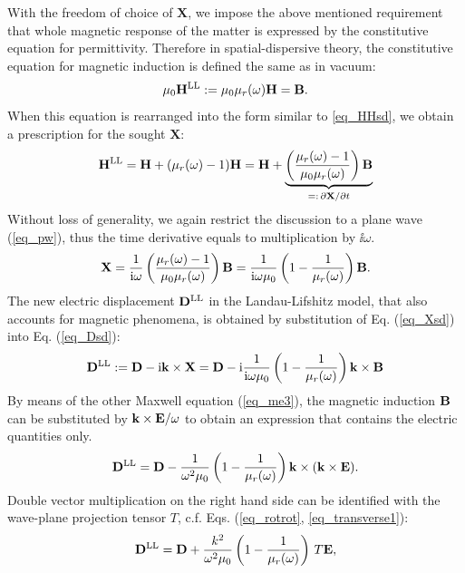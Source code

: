 With the freedom of choice of $\mathbf{X}$, we impose the above mentioned requirement that whole magnetic response of the matter is expressed by the constitutive equation for permittivity. Therefore in spatial-dispersive theory, the constitutive equation %
for magnetic induction is defined the same as in vacuum:
\begin{equation} \mu_0 {\mathbf{H}^\text{LL}} := \mu_0 \mu_r(\omega) \mathbf{H} = \mathbf{B}. \label{eq_mu_sd}\end{equation}
When this equation is rearranged into the form similar to \ref{eq_HHsd}, we obtain a prescription for the sought $\mathbf{X}$: 
$$ {\mathbf{H}^\text{LL}} = \mathbf{H} + (\mu_r(\omega) -1)\mathbf{H} = \mathbf{H} + \underbrace{\left(\frac{\mu_r(\omega)-1}{\mu_0\mu_r(\omega)}\right)\mathbf{B}}_{=:\,\partial\mathbf{X}/\partial t}$$
Without loss of generality, we again restrict the discussion to a plane wave (\ref{eq_pw}), thus the time derivative equals to multiplication by $\ii\omega$.
\begin{equation} \mathbf{X} = \frac{1}{{\mathrm i}\omega}\left(\frac{\mu_r(\omega)-1}{\mu_0\mu_r(\omega)}\right)\mathbf{B} = \frac{1}{{\mathrm i}\omega\mu_0}\left(1 - \frac{1}{\mu_r(\omega)}\right)\mathbf{B}. \label{eq_Xsd}\end{equation}
The new electric displacement ${\mathbf{D}^\text{LL}}$ in the  Landau-Lifshitz model, that also accounts for magnetic phenomena, is obtained by substitution of Eq. (\ref{eq_Xsd}) into Eq. (\ref{eq_Dsd}):
\begin{equation} {\mathbf{D}^\text{LL}} := \mathbf{D} - {\mathrm i}{\mathbf{k}}\times \mathbf{X} =  \mathbf{D} - {\mathrm i}  \frac{1}{{\mathrm i}\omega\mu_0}\left(1 - \frac{1}{\mu_r(\omega)}\right) {\mathbf{k}}\times \mathbf{B}  \label{eq_Dsd2}\end{equation}
By means of the other Maxwell equation (\ref{eq_me3}), the magnetic induction $\mathbf{B}$ can be substituted by ${\mathbf{k}}\times\mathbf{E} / \omega$ to obtain an expression that contains the electric quantities only.
\begin{equation} {\mathbf{D}^\text{LL}} = \mathbf{D} - \frac{1}{\omega^2 \mu_0}\left(1 - \frac{1}{\mu_r(\omega)}\right) {\mathbf{k}}\times({\mathbf{k}}\times \mathbf{E}).  \label{eq_Dsd3}\end{equation} 
Double vector multiplication on the right hand side can be identified with the wave-plane projection tensor $T$, c.f. Eqs. (\ref{eq_rotrot}, \ref{eq_transverse1}):
\begin{equation} {\mathbf{D}^\text{LL}} = \mathbf{D} + \frac{k^2}{\omega^2 \mu_0}\left(1 - \frac{1}{\mu_r(\omega)}\right) \, T \mathbf{E},  \label{eq_Dsd4}\end{equation} 

